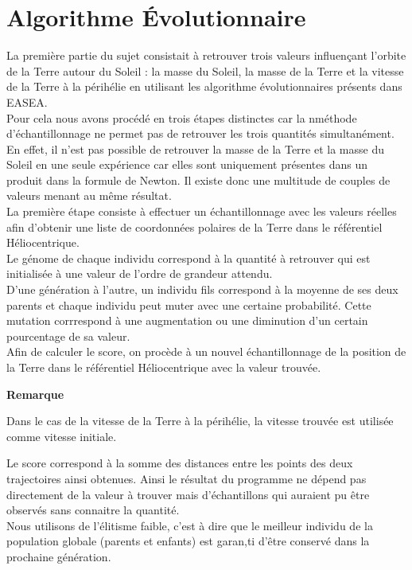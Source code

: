 \section{Algorithme \'Evolutionnaire}

La première partie du sujet consistait à retrouver trois valeurs influençant l'orbite de la Terre autour du Soleil : la masse du Soleil, la masse de la Terre et la vitesse de la Terre à la périhélie en utilisant les algorithme évolutionnaires présents dans EASEA.\\
Pour cela nous avons procédé en trois étapes distinctes car la nméthode d'échantillonnage ne permet pas de retrouver les trois quantités simultanément. En effet, il n'est pas possible de retrouver la masse de la Terre et la masse du Soleil en une seule expérience car elles sont uniquement présentes dans un produit dans la formule de Newton. Il existe donc une multitude de couples de valeurs menant au même résultat.\\
La première étape consiste à effectuer un échantillonnage avec les valeurs réelles afin d'obtenir une liste de coordonnées polaires de la Terre dans le référentiel Héliocentrique.\\
Le génome de chaque individu correspond à la quantité à retrouver qui est initialisée à une valeur de l'ordre de grandeur attendu.\\
D'une génération à l'autre, un individu fils correspond à la moyenne de ses deux parents et chaque individu peut muter avec une certaine probabilité. Cette mutation corrrespond à une augmentation ou une diminution d'un certain pourcentage de sa valeur.\\
Afin de calculer le score, on procède à un nouvel échantillonnage de la position de la Terre dans le référentiel Héliocentrique avec la valeur trouvée.\\
\noindent
\begin{minipage}[!hc]{0.12\textwidth}
   \textbf{Remarque}
\end{minipage}
\vrule\enskip\vrule\quad\begin{minipage}{\dimexpr 0.87\textwidth-0.8pt-1.5em}
Dans le cas de la vitesse de la Terre à la périhélie, la vitesse trouvée est utilisée comme vitesse initiale.
\end{minipage}
Le score correspond à la somme des distances entre les points des deux trajectoires ainsi obtenues. Ainsi le résultat du programme ne dépend pas directement de la valeur à trouver mais d'échantillons qui auraient pu être observés sans connaitre la quantité.\\
Nous utilisons de l'élitisme faible, c'est à dire que le meilleur individu de la population globale (parents et enfants) est garan,ti d'être conservé dans la prochaine génération.

